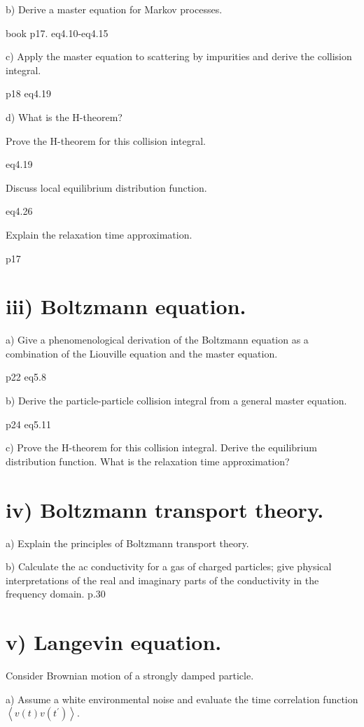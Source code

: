 \documentclass[UTF8]{ctexart}
\begin{document}
b) Derive a master equation for Markov processes.

book p17.
eq4.10-eq4.15

c) Apply the master equation to scattering by impurities and derive the collision integral.

p18 eq4.19

d) What is the H-theorem?

Prove the H-theorem for this collision integral. 

eq4.19

Discuss local equilibrium distribution function. 

eq4.26

Explain the relaxation time approximation.

p17

\section{iii) Boltzmann equation.}

a) Give a phenomenological derivation of the Boltzmann equation as a combination of the Liouville equation and the master equation.

p22 eq5.8

b) Derive the particle-particle collision integral from a general master equation.

p24 eq5.11

c) Prove the H-theorem for this collision integral. Derive the equilibrium distribution function. What is the relaxation time approximation?

\section{iv) Boltzmann transport theory.}

a) Explain the principles of Boltzmann transport theory.

b) Calculate the ac conductivity for a gas of charged particles; give physical interpretations of the real and imaginary parts of the conductivity in the frequency domain.
 p.30

\section{v) Langevin equation.}

Consider Brownian motion of a strongly damped particle.

a) Assume a white environmental noise and evaluate the time correlation function $\left\langle v(t) v\left(t^{\prime}\right)\right\rangle$.
\end{document}
